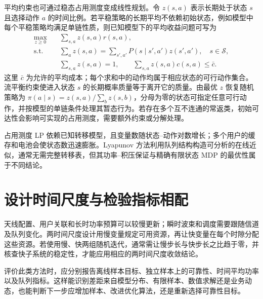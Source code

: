 平均约束也可通过稳态占用测度变成线性规划。令 $z(s,a)$ 表示长期处于状态 $s$ 且选择动作 $a$ 的时间比例。若平稳策略的长期平均不依赖初始状态，例如模型中每个平稳策略均满足单链性质，则已知模型下的平均收益问题可写为
\begin{align}
 \max_{z\ge0}\quad&\sum_{s,a}z(s,a)r(s,a),\\
 \text{s.t.}\quad&\sum_a z(s,a)=
       \sum_{s',a'}P(s\mid s',a')z(s',a'),\quad s\in\mathcal S,\\
 &\sum_{s,a}z(s,a)=1,\qquad
 \sum_{s,a}z(s,a)c(s,a)\le\bar c.
 \label{eq:mdp-occupation}
\end{align}
这里 $\bar c$ 为允许的平均成本；每个求和中的动作均属于相应状态的可行动作集合。流平衡约束使进入状态 $s$ 的长期概率质量等于离开它的质量。由最优 $z$ 恢复随机策略为
$\pi(a\mid s)=z(s,a)/\sum_bz(s,b)$，分母为零的状态可指定任意可行动作，并按模型的单链条件处理其暂态行为。若存在多个互不连通的常返类，初始可达性会影响可实现的占用测度，需要额外约束或分解处理。

占用测度 LP 依赖已知转移模型，且变量数随状态--动作对数增长；多个用户的缓存和电池会使状态数迅速膨胀。Lyapunov 方法利用队列结构构造可分析的在线近似，通常无需完整转移表，但其功率--积压保证与精确有限状态 MDP 的最优性属于不同结论。

\section{设计时间尺度与检验指标相配}
天线配置、用户关联和长时功率预算可以较慢更新；瞬时波束和调度需要跟随信道及队列变化。两时间尺度设计用慢变量规定可用资源，再让快变量在每个时隙分配这些资源。若使用慢、快两组随机迭代，通常需让慢步长与快步长之比趋于零，并核查快子系统的稳定性，才能应用相应的两时间尺度收敛结论。

评价此类方法时，应分别报告离线样本目标、独立样本上的可靠性、时间平均功率以及队列指标。这样能识别差距来自模型分布、有限样本、数值求解还是业务动态，也能判断下一步应增加样本、改进优化算法，还是重新选择可靠性目标。
